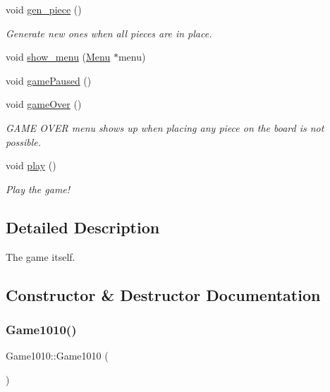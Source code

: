 \begin{DoxyCompactItemize}
void \mbox{\hyperlink{class_game1010_a9576170947a355682c922cb648432b9e}{gen\+\_\+piece}} ()
\begin{DoxyCompactList}\small\item\em Generate new ones when all pieces are in place. \end{DoxyCompactList}\item 
void \mbox{\hyperlink{class_game1010_a99d6f53c3073861fe37ef67caa073840}{show\+\_\+menu}} (\mbox{\hyperlink{class_menu}{Menu}} $\ast$menu)
\item 
void \mbox{\hyperlink{class_game1010_ab9c6def8a07ae00b55bd9b51f407eecd}{game\+Paused}} ()
\item 
void \mbox{\hyperlink{class_game1010_a3bc296b7ba6bffeda3baceb1240190b6}{game\+Over}} ()
\begin{DoxyCompactList}\small\item\em G\+A\+ME O\+V\+ER menu shows up when placing any piece on the board is not possible. \end{DoxyCompactList}\item 
void \mbox{\hyperlink{class_game1010_afa18a3a81b8966417a228459a5bebf53}{play}} ()
\begin{DoxyCompactList}\small\item\em Play the game! \end{DoxyCompactList}\end{DoxyCompactItemize}


\subsection{Detailed Description}
The game itself. 

\subsection{Constructor \& Destructor Documentation}
\mbox{\label{class_game1010_a0a0688219844edbe8f4a44c11a13e32a}} 
\subsubsection{\texorpdfstring{Game1010()}{Game1010()}}
{\footnotesize\ttfamily Game1010\+::\+Game1010 (\begin{DoxyParamCaption}{ }\end{DoxyParamCaption})\hspace{0.3cm}{\ttfamily [inline]}}



